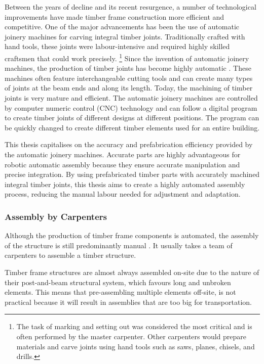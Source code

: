Between the years of decline and its recent resurgence, a number of technological improvements have made timber frame construction more efficient and competitive. One of the major advancements has been the use of automatic joinery machines for carving integral timber joints. Traditionally crafted with hand tools, these joints were labour-intensive and required highly skilled craftsmen that could work precisely.
\footnote{The task of marking and setting out was considered the most critical and is often performed by the master carpenter. Other carpenters would prepare materials and carve joints using hand tools such as saws, planes, chisels, and drills.}
Since the invention of automatic joinery machines, the production of timber joints has become highly automatic \parencite{hanshundeggeragCorporateDevelopment2023}. These machines often feature interchangeable cutting tools and can create many types of joints at the beam ends and along its length. Today, the machining of timber joints is very mature and efficient. The automatic joinery machines are controlled by computer numeric control (CNC) technology and can follow a digital program to create timber joints of different designs at different positions. The program can be quickly changed to create different timber elements used for an entire building. 

This thesis capitalises on the accuracy and prefabrication efficiency provided by the automatic joinery machines. Accurate parts are highly advantageous for robotic automatic assembly because they ensure accurate manipulation and precise integration. By using prefabricated timber parts with accurately machined integral timber joints, this thesis aims to create a highly automated assembly process, reducing the manual labour needed for adjustment and adaptation. 

\subsubsection{Assembly by Carpenters}
\label{subsubsection:introduction_assembly_by_carpenters}

Although the production of timber frame components is automated, the assembly of the structure is still predominantly manual \parencite{willmannNewParadigmsAutomatic2016}. It usually takes a team of carpenters to assemble a timber structure.

Timber frame structures are almost always assembled on-site due to the nature of their post-and-beam structural system, which favours long and unbroken elements. This means that pre-assembling multiple elements off-site, is not practical because it will result in assemblies that are too big for transportation. 

